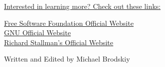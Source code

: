 \documentclass[12pt]{article}
\begin{document}
 \begin{center}
   \vspace{10pt}
   \underline{Interested in learning more? Check out these links:}
 \end{center}

 \begin{center}
   \href{fsf.org}{Free Software Foundation Official Website}\\\vspace{10pt}
   \href{gnu.org}{GNU Official Website}\\\vspace{10pt}
   \href{stallman.org}{Richard Stallman's Official Website}\\\vspace{10pt}
 \end{center}

 \begin{center}
   \tiny Written and Edited by Michael Brodskiy
 \end{center}
 
\end{document}
